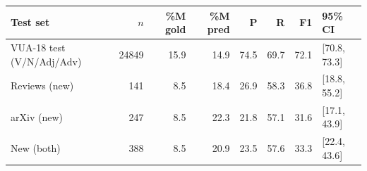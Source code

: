 \begin{tabular}{lrrrrrrl}
\toprule
Test set & $n$ & \%M gold & \%M pred & P & R & F1 & 95\% CI \\
\midrule
VUA-18 test (V/N/Adj/Adv) & 24849 & 15.9 & 14.9 & 74.5 & 69.7 & 72.1 & [70.8, 73.3] \\
Reviews (new) & 141 & 8.5 & 18.4 & 26.9 & 58.3 & 36.8 & [18.8, 55.2] \\
arXiv (new) & 247 & 8.5 & 22.3 & 21.8 & 57.1 & 31.6 & [17.1, 43.9] \\
New (both) & 388 & 8.5 & 20.9 & 23.5 & 57.6 & 33.3 & [22.4, 43.6] \\
\bottomrule
\end{tabular}
